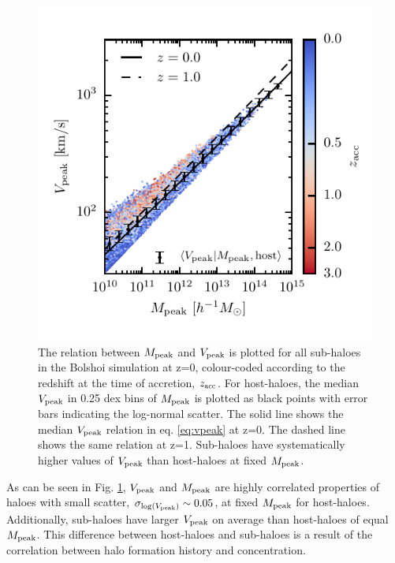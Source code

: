 \documentclass[a4paper,fleqn,usenatbib]{mnras}
\begin{document}
\begin{figure}
    \includegraphics{figures/mpeak_vs_vpeak.pdf}
    \caption{The relation between $M_{\rm peak}$ and $V_{\rm peak}$ is plotted for all sub-haloes in the Bolshoi simulation at z=0, colour-coded according to the redshift at the time of accretion, $z_{\rm acc}$.  For host-haloes, the median $V_{\rm peak}$ in 0.25 dex bins of $M_{\rm peak}$ is plotted as black points with error bars indicating the log-normal scatter.  The solid line shows the median $V_{\rm peak}$ relation in eq. \ref{eq:vpeak} at z=0.  The dashed line shows the same relation at z=1.  Sub-haloes have systematically higher values of $V_{\rm peak}$ than host-haloes at fixed $M_{\rm peak}$.}
    \label{fig:mpeak_vpeak}
\end{figure}

As can be seen in Fig. \ref{fig:mpeak_vpeak}, $V_{\rm peak}$ and $M_{\rm peak}$ are highly correlated properties of haloes with small scatter, $\sigma_{\log(V_{\rm peak})}\sim 0.05$, at fixed $M_{\rm peak}$ for host-haloes.  Additionally, sub-haloes have larger $V_{\rm peak}$ on average than host-haloes of equal $M_{\rm peak}$.  This difference between host-haloes and sub-haloes is a result of the correlation between halo formation history and concentration.  
\end{document}
